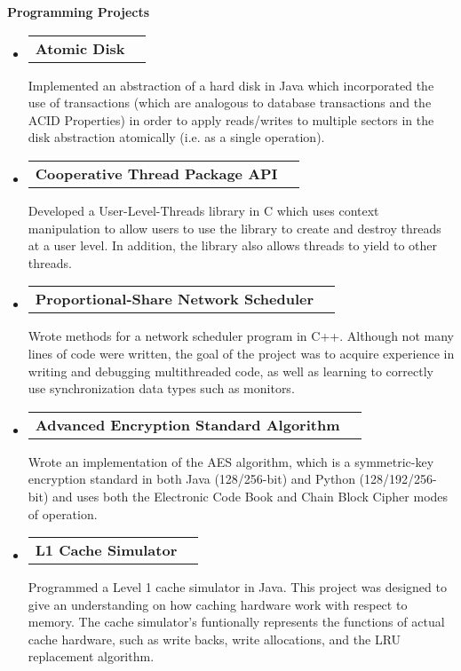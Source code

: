 \documentclass[letterpaper,10pt]{article}
\makeatletter
\newcommand{\resheading}[1]{{\large \colorbox{mygrey}{\begin{minipage}{\textwidth}{\textbf{#1 \vphantom{p\^{E}}}}\end{minipage}}}}
\newcommand{\projectheading}[1]{
\begin{tabular*}{6.5in}{l@{\extracolsep{\fill}}r}
		\textbf{#1}
\end{tabular*}\vspace{6pt}}
\makeatother
\begin{document}
\resheading{Programming Projects}
	\begin{itemize}
		\item 
			\projectheading{Atomic Disk}
				{
				\begin{itemize}
					{Implemented an abstraction of a hard disk in Java which incorporated}
					{the use of transactions (which are analogous to database transactions and the ACID Properties) in order to apply reads/writes to multiple}
					{sectors in the disk abstraction atomically (i.e. as a single operation).}
				\end{itemize}
				}
		\item
			\projectheading{Cooperative Thread Package API}
				{
				\begin{itemize}
					{Developed a User-Level-Threads library in C which uses context manipulation}
					{to allow users to use the library to create and destroy threads at a user level.}
					{In addition, the library also allows threads to yield to other threads.}
				\end{itemize}
        			}
        	\item
			\projectheading{Proportional-Share Network Scheduler}
				{
				\begin{itemize}
					{Wrote methods for a network scheduler program in C++. Although}
					{not many lines of code were written, the goal of the project was to acquire}
					{experience in writing and debugging multithreaded code, as well as}
					{learning to correctly use synchronization data types such as monitors.}
				\end{itemize}
				}
		\item 
			\projectheading{Advanced Encryption Standard Algorithm}
				{
				\begin{itemize}
					{Wrote an implementation of the AES algorithm, which is a symmetric-key encryption}
					{standard in both Java (128/256-bit) and Python (128/192/256-bit) and uses both the}
					{Electronic Code Book and Chain Block Cipher modes of operation.}
				\end{itemize}
				}
		\item			
			\projectheading{L1 Cache Simulator}
				{
				\begin{itemize}
					{Programmed a Level 1 cache simulator in Java. This project was designed to give an understanding on how}
					{caching hardware work with respect to memory. The cache simulator's funtionally represents the functions}
					{of actual cache hardware, such as write backs, write allocations, and the LRU replacement algorithm.}

\end{itemize}}
\end{itemize}
\end{document}

